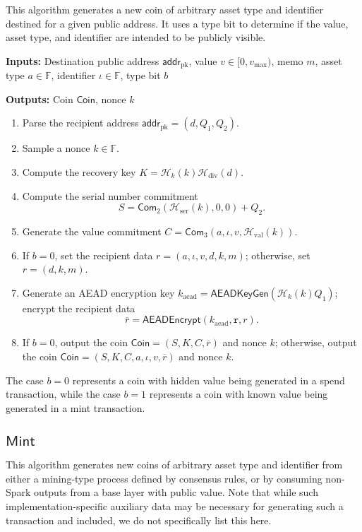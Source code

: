 \documentclass{article}
\newcommand{\F}{\mathbb{F}}
\newcommand{\func}[1]{\mathsf{#1}}
\newcommand{\addr}{\func{addr}}
\newcommand{\com}{\func{Com}}
\newcommand{\hash}{\mathcal{H}}
\begin{document}
This algorithm generates a new coin of arbitrary asset type and identifier destined for a given public address.
It uses a type bit to determine if the value, asset type, and identifier are intended to be publicly visible.

\textbf{Inputs:} Destination public address $\addr_{\text{pk}}$, value $v \in [0, v_{\text{max}})$, memo $m$, asset type $a \in \F$, identifier $\iota \in \F$, type bit $b$

\textbf{Outputs:} Coin $\func{Coin}$, nonce $k$

\begin{enumerate}
\item Parse the recipient address $\addr_{\text{pk}} = (d, Q_1, Q_2)$.
\item Sample a nonce $k \in \F$.
\item Compute the recovery key $K = \hash_k(k)\hash_{\text{div}}(d)$.
\item Compute the serial number commitment $$S = \com_2(\hash_{\text{ser}}(k), 0, 0) + Q_2.$$
\item Generate the value commitment $C = \com_3(a, \iota, v, \hash_{\text{val}}(k))$.
\item If $b = 0$, set the recipient data $r = (a,\iota,v,d,k,m)$; otherwise, set $r = (d,k,m)$.
\item Generate an AEAD encryption key $k_{\text{aead}} = \func{AEADKeyGen}(\hash_k(k)Q_1)$; encrypt the recipient data $$\overline{r} = \func{AEADEncrypt}(k_{\text{aead}},\texttt{r},r).$$
\item If $b=0$, output the coin $\func{Coin} = (S, K, C, \overline{r})$ and nonce $k$; otherwise, output the coin $\func{Coin} = (S, K, C, a, \iota, v, \overline{r})$ and nonce $k$.
\end{enumerate}
The case $b=0$ represents a coin with hidden value being generated in a spend transaction, while the case $b=1$ represents a coin with known value being generated in a mint transaction.


\subsection{\texorpdfstring{$\func{Mint}$}{Mint}}

This algorithm generates new coins of arbitrary asset type and identifier from either a mining-type process defined by consensus rules, or by consuming non-Spark outputs from a base layer with public value.
Note that while such implementation-specific auxiliary data may be necessary for generating such a transaction and included, we do not specifically list this here.
\end{document}
